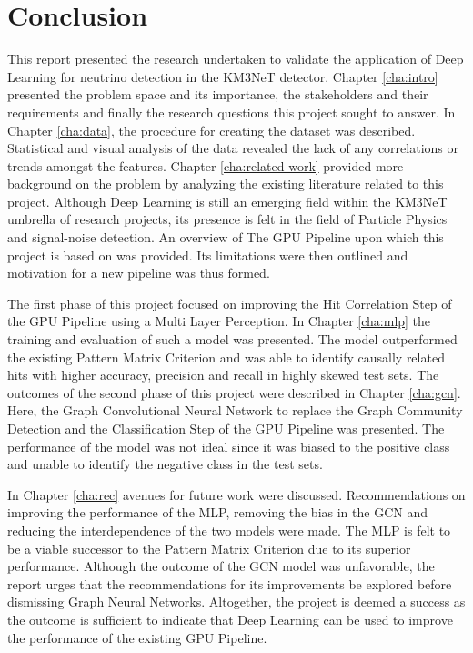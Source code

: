 
\chapter{Conclusion} %

% 

This report presented the research undertaken to validate the
application of Deep Learning for neutrino detection in the KM3NeT
detector. Chapter \ref{cha:intro} presented the problem space and its
importance, the stakeholders and their requirements and finally the
research questions this project sought to answer. In Chapter
\ref{cha:data}, the procedure for creating the dataset was described.
Statistical and visual analysis of the data revealed the lack of any
correlations or trends amongst the features. Chapter
\ref{cha:related-work} provided more background on the problem by
analyzing the existing literature related to this project. Although
Deep Learning is still an emerging field within the KM3NeT umbrella of
research projects, its presence is felt in the field of Particle
Physics and signal-noise detection. An overview of The GPU Pipeline
upon which this project is based on was provided. Its limitations
were then outlined and motivation for a new pipeline was thus formed.

The first phase of this project focused on improving the Hit
Correlation Step of the GPU Pipeline using a Multi Layer Perception.
In Chapter \ref{cha:mlp} the training and evaluation of such a model
was presented. The model outperformed the existing Pattern Matrix
Criterion and was able to identify causally related hits with higher
accuracy, precision and recall in highly skewed test sets. The
outcomes of the second phase of this project were described in Chapter
\ref{cha:gcn}. Here, the Graph Convolutional Neural Network to replace
the Graph Community Detection and the Classification Step of the GPU
Pipeline was presented. The performance of the model was not ideal
since it was biased to the positive class and unable to identify the
negative class in the test sets.

In Chapter \ref{cha:rec} avenues for future work were discussed.
Recommendations on improving the performance of the MLP, removing the
bias in the GCN and reducing the interdependence of the two models
were made. The MLP is felt to be a viable successor to the Pattern
Matrix Criterion due to its superior performance. Although the outcome
of the GCN model was unfavorable, the report urges that the
recommendations for its improvements be explored before dismissing
Graph Neural Networks. Altogether, the project is deemed a success as
the outcome is sufficient to indicate that Deep Learning can be used
to improve the performance of the existing GPU Pipeline.

